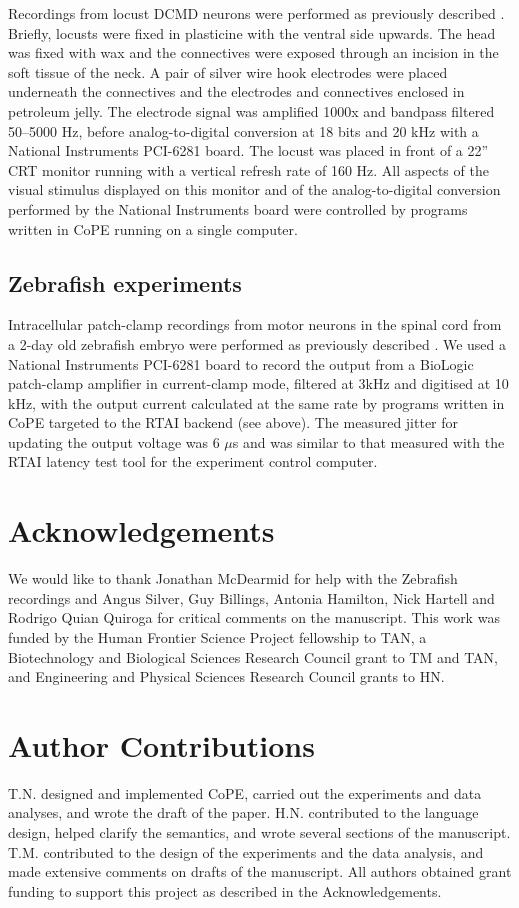 Recordings from locust DCMD neurons were performed as previously
described \cite{Matheson2004}. Briefly, locusts were fixed in
plasticine with the ventral side upwards. The head was fixed with wax
and the connectives were exposed through an
incision in the soft tissue of the neck. A pair of silver wire hook
electrodes were placed underneath the connectives and the electrodes
and connectives enclosed in petroleum jelly. The electrode signal was
amplified 1000x and bandpass filtered 50--5000 Hz, before
analog-to-digital conversion at 18 bits and 20 kHz with a National
Instruments PCI-6281 board. The locust was placed in front of a 22''
CRT monitor running with a vertical refresh rate of 160 Hz. All
aspects of the visual stimulus displayed on this monitor and of
the analog-to-digital conversion performed by the National Instruments
board were controlled by programs written in 
CoPE running on a single computer.

\subsection*{Zebrafish experiments}

Intracellular patch-clamp recordings from motor neurons in the spinal
cord from a 2-day old zebrafish embryo were performed as previously
described \cite{McDearmid2006}. We used a National Instruments PCI-6281
board to
record the output from a BioLogic patch-clamp amplifier in
current-clamp mode, filtered at 3kHz and digitised at 10 kHz, with the
output current calculated at the same rate by programs written in
CoPE targeted to the RTAI backend (see
above). The measured jitter for updating the output voltage was 6
$\mu$s and was similar to that measured with the RTAI latency test
tool for the experiment control computer.

\section*{Acknowledgements} 

We would like to thank Jonathan McDearmid for help with the Zebrafish
recordings and Angus Silver, Guy Billings, Antonia Hamilton, Nick
Hartell and Rodrigo Quian Quiroga for critical comments on the
manuscript. This work was funded by the Human Frontier Science Project
fellowship to TAN, a Biotechnology and Biological Sciences Research
Council grant to TM and TAN, and Engineering and Physical Sciences Research
Council grants to HN.

\section*{Author Contributions}  
T.N. designed and implemented CoPE, carried out the experiments and
data analyses, and wrote the draft of the paper. H.N. contributed to
the language design, helped clarify the semantics, and wrote several
sections of the manuscript. T.M. contributed to the design of the
experiments and the data analysis, and made extensive comments on
drafts of the manuscript. All authors obtained grant funding to
support this project as described in the Acknowledgements.


